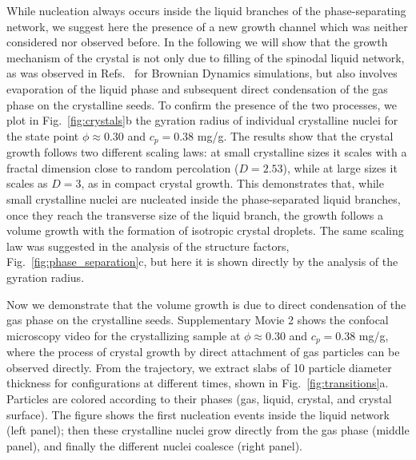 \documentclass[preprint,amsmath,amssymb,superscriptaddress]{revtex4}
\begin{document}
While nucleation always occurs inside the liquid branches of the phase-separating network, we suggest here the presence of a new growth channel
which was neither considered nor observed before. In the following we will show that the growth mechanism of the crystal is not only due to filling of the spinodal liquid network, as was observed in Refs.~\cite{soga1999metastable,fortini2008crystallization,perez2011pathways} for Brownian Dynamics simulations, but also involves 
evaporation of the liquid phase and subsequent direct condensation of the gas phase on the crystalline seeds. 
To confirm the presence of the two processes, we plot in Fig.~\ref{fig:crystals}b the gyration radius of individual crystalline nuclei for the state point 
$\phi\approx 0.30$ and $c_p=0.38$ mg/g. The results show that the crystal growth follows two different scaling laws: at small crystalline sizes it scales with 
a fractal dimension close to random percolation ($D=2.53$), while at large sizes it scales as $D=3$, as in compact crystal growth. This demonstrates that, while 
small crystalline nuclei are nucleated inside the phase-separated liquid branches, once they reach the transverse size of the liquid branch, the growth 
follows a volume growth with the formation of isotropic crystal droplets. The same scaling law was suggested in the analysis of the
structure factors, Fig.~\ref{fig:phase_separation}c, but here it is shown directly by the analysis of the gyration radius. 

Now we demonstrate that the volume growth is due to direct condensation of the gas phase on the crystalline seeds.
Supplementary Movie 2 shows the confocal microscopy video for the crystallizing sample at $\phi\approx 0.30$ and $c_p=0.38$ mg/g,
where the process of crystal growth by direct attachment of gas particles can be observed directly. 
From the trajectory, we extract slabs of 10 particle diameter thickness for configurations at different times, shown in Fig.~\ref{fig:transitions}a. 
Particles are colored according to their phases (gas, liquid, crystal, and crystal surface). The figure shows the first nucleation 
events inside the liquid network (left panel); then these crystalline nuclei grow directly from the gas phase (middle panel), and finally
the different nuclei coalesce (right panel). 

\end{document}
